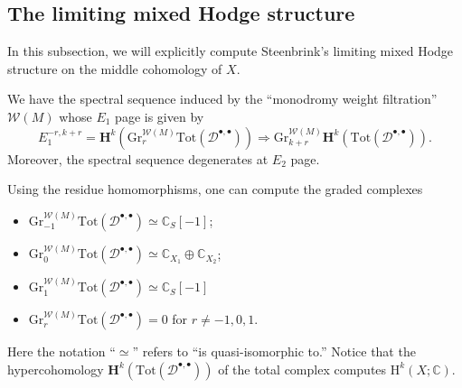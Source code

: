 \subsection{The limiting mixed Hodge structure}
In this subsection, we will explicitly compute
Steenbrink's limiting mixed Hodge structure on the
middle cohomology of \(X\).

We have the spectral sequence induced by the ``monodromy weight filtration'' 
\(\mathcal{W}(M)\)
whose \(E_{1}\) page is given by
\begin{equation}
E_{1}^{-r,k+r} = \mathbf{H}^{k}
(\mathrm{Gr}_{r}^{\mathcal{W}(M)}\mathrm{Tot}(\mathcal{D}^{\bullet,\bullet}))
\Rightarrow \mathrm{Gr}_{k+r}^{\mathcal{W}(M)}\mathbf{H}^{k}(\mathrm{Tot}(\mathcal{D}^{\bullet,\bullet})).
\end{equation}
Moreover, the spectral sequence degenerates at \(E_{2}\) page.

Using the residue homomorphisms, one can compute the graded complexes
\begin{itemize}
\item \(\mathrm{Gr}_{-1}^{\mathcal{W}(M)}\mathrm{Tot}(\mathcal{D}^{\bullet,\bullet})
\simeq\mathbb{C}_{S}[-1]\);
\item \(\mathrm{Gr}_{0}^{\mathcal{W}(M)}\mathrm{Tot}(\mathcal{D}^{\bullet,\bullet})\simeq
\mathbb{C}_{X_{1}}\oplus\mathbb{C}_{X_{2}}\);
\item \(\mathrm{Gr}_{1}^{\mathcal{W}(M)}\mathrm{Tot}(\mathcal{D}^{\bullet,\bullet})
\simeq\mathbb{C}_{S}[-1]\)
\item \(\mathrm{Gr}_{r}^{\mathcal{W}(M)}\mathrm{Tot}(\mathcal{D}^{\bullet,\bullet})=0\)
for \(r\ne -1,0,1\).
\end{itemize}
Here the notation ``\(\simeq\)'' refers to ``is quasi-isomorphic to.''
Notice that the hypercohomology 
\(\mathbf{H}^{k}(\mathrm{Tot}(\mathcal{D}^{\bullet,\bullet}))\) 
of the total complex computes \(\mathrm{H}^{k}(X;\mathbb{C})\).

